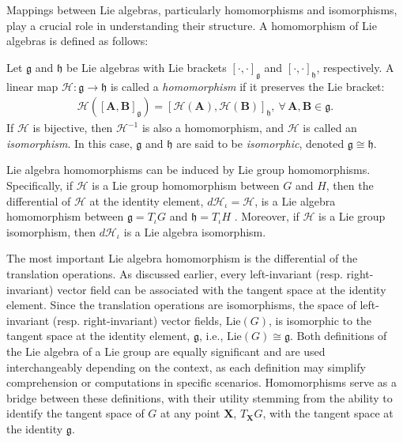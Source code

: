Mappings between Lie algebras, particularly homomorphisms and isomorphisms, play a crucial role in understanding their structure. A homomorphism of Lie algebras is defined as follows:
\begin{definition}
    Let $\mathfrak{g}$ and $\mathfrak{h}$ be Lie algebras with Lie brackets $[\cdot, \cdot]_\mathfrak{g}$ and $[\cdot, \cdot]_\mathfrak{h}$, respectively. A linear map $\mathscr{H}:\mathfrak{g}\to\mathfrak{h}$ is called a \emph{homomorphism} if it preserves the Lie bracket:
    \begin{align*}
        \mathscr{H}([\mathbf{A}, \mathbf{B}]_\mathfrak{g}) = [\mathscr{H}(\mathbf{A}), \mathscr{H}(\mathbf{B})]_\mathfrak{h},\ \forall\, \mathbf{A},\mathbf{B}\in\mathfrak{g}.
    \end{align*}
    If $\mathscr{H}$ is bijective, then $\mathscr{H}^{-1}$ is also a homomorphism, and $\mathscr{H}$ is called an \emph{isomorphism}. In this case, $\mathfrak{g}$ and $\mathfrak{h}$ are said to be \emph{isomorphic}, denoted $\mathfrak{g}\cong\mathfrak{h}$.
\end{definition}
Lie algebra homomorphisms can be induced by Lie group homomorphisms. Specifically, if $\mathcal{H}$ is a Lie group homomorphism between $G$ and $H$, then the differential of $\mathcal{H}$ at the identity element, $d\mathcal{H}_\iota=\mathscr{H}$, is a Lie algebra homomorphism between $\mathfrak{g}=T_\iota G$ and $\mathfrak{h}=T_\iota H$ \citep[p. 41]{Duistermaat2012}. Moreover, if $\mathcal{H}$ is a Lie group isomorphism, then $d\mathcal{H}_\iota$ is a Lie algebra isomorphism.

The most important Lie algebra homomorphism is the differential of the translation operations. As discussed earlier, every left-invariant (resp. right-invariant) vector field can be associated with the tangent space at the identity element. Since the translation operations are isomorphisms, the space of left-invariant (resp. right-invariant) vector fields, $\text{Lie}(G)$, is isomorphic to the tangent space at the identity element, $\mathfrak{g}$, i.e., $\text{Lie}(G) \cong \mathfrak{g}$. Both definitions of the Lie algebra of a Lie group are equally significant and are used interchangeably depending on the context, as each definition may simplify comprehension or computations in specific scenarios. Homomorphisms serve as a bridge between these definitions, with their utility stemming from the ability to identify the tangent space of $G$ at any point $\mathbf{X}$, $T_\mathbf{X}G$, with the tangent space at the identity $\mathfrak{g}$.

